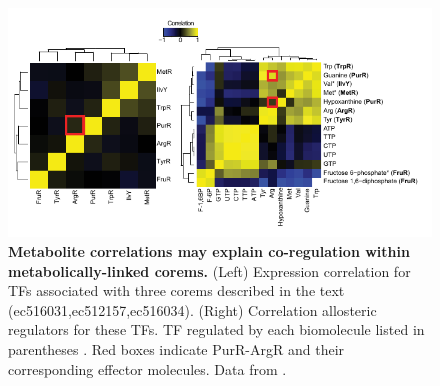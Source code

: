 \begin{figure}[hp]
\centering
\includegraphics[width=0.95\linewidth]{figures/purR_effector.pdf}
\caption[Metabolite correlations may explain co-regulation within metabolically-linked corems]{\textbf{Metabolite correlations may explain co-regulation within metabolically-linked corems.} (Left) Expression correlation for TFs associated with three corems described in the text (ec516031,ec512157,ec516034). (Right) Correlation allosteric regulators for these TFs. TF regulated by each biomolecule listed in parentheses \cite{Novichkov2010}. Red boxes indicate PurR-ArgR and their corresponding effector molecules. Data from \cite{Ishii2007}.}
\label{fig:purR_effector}
\end{figure}

